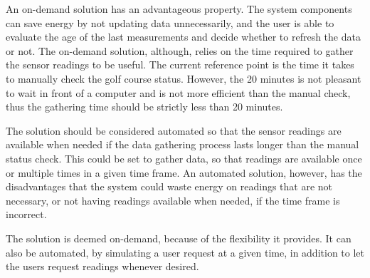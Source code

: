 \iffalse
\begin{enumerate}
	\item The system user will use an interface to demand readings from the sensors in the network.
	\item The main node responds to the demand by sending a request packet in the network.
	\item The nodes receiving the signal gathers data from its sensors and sends it back to its parent.
	\item When the sent packet is acknowledged, the node retransmits the recently received request signal and awaits data.
	\item Step 3 and 4 is repeated throughout the network, so that every node within reach of the network will transmit or relay data to its parent.
	\item The main node collects all data and append each reading to the respective node in a data sheet available to the user.
\end{enumerate}
\fi

An on-demand solution has an advantageous property. The system components can save energy by not updating data unnecessarily, and the user is able to evaluate the age of the last measurements and decide whether to refresh the data or not. The on-demand solution, although, relies on the time required to gather the sensor readings to be useful. The current reference point is the time it takes to manually check the golf course status. However, the 20 minutes  is not pleasant to wait in front of a computer and is not more efficient than the manual check, thus the gathering time should be strictly less than 20 minutes.

The solution should be considered automated so that the sensor readings are available when needed if the data gathering process lasts longer than the manual status check. This could be set to gather data, so that readings are available once or multiple times in a given time frame. An automated solution, however, has the disadvantages that the system could waste energy on readings that are not necessary, or not having readings available when needed, if the time frame is incorrect.

The solution is deemed on-demand, because of the flexibility it provides. It can also be automated, by simulating a user request at a given time, in addition to let the users request readings whenever desired.

